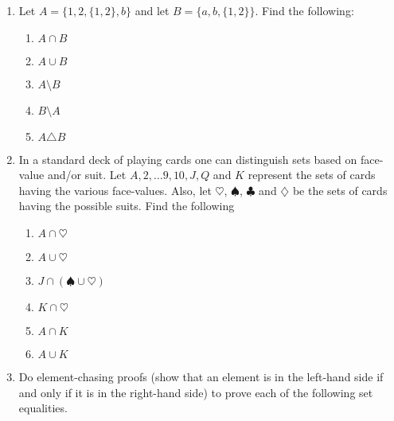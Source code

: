 \begin{enumerate}
\item Let $A = \{1, 2, \{1, 2\}, b\}$ and let $B=\{a, b, \{1, 2\} \}$.
Find the following:
  \begin{enumerate}
  \item \wbitemsep $A \cap B$   
  \item \wbitemsep $A \cup B$ 
  \item \wbitemsep $A \setminus B$ 
  \item \wbitemsep $B \setminus A$ 
  \item \wbitemsep $A \triangle B$ 
  \end{enumerate}

\vfill

\workbookpagebreak

\item In a standard deck of playing cards one can distinguish sets
based on face-value and/or suit.  Let $A, 2, \ldots 9, 10, J, Q$ and $K$
represent the sets of cards having the various face-values.  Also, let
$\heartsuit$, $\spadesuit$, $\clubsuit$ and $\diamondsuit$ be the 
sets of cards having the possible suits.  Find the following
  \begin{enumerate}
  \item \wbitemsep$A \cap \heartsuit$ 
  \item \wbitemsep$A \cup \heartsuit$ 
  \item \wbitemsep$J \cap (\spadesuit \cup \heartsuit)$ 
  \item \wbitemsep$K \cap \heartsuit$ 
  \item \wbitemsep$A \cap K$ \hint{$\emptyset$ }
  \item \wbitemsep$A \cup K$ 
  \end{enumerate}

\vfill

\workbookpagebreak

\item Do element-chasing proofs (show that an element is in the left-hand side if and only if it is in the right-hand side) to prove each of the following set equalities.  


\end{enumerate}
